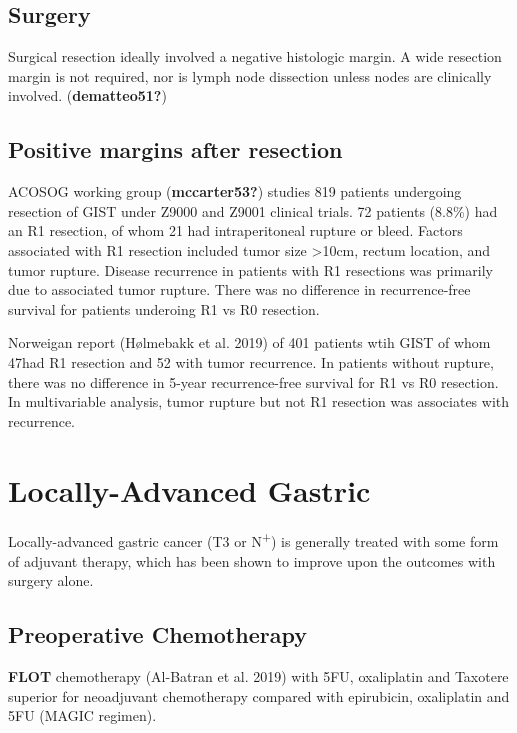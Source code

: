 \documentclass[
  letterpaper,
]{scrbook}
\begin{document}
\section{Surgery}\label{surgery}

Surgical resection ideally involved a negative histologic margin. A wide
resection margin is not required, nor is lymph node dissection unless
nodes are clinically involved. (\textbf{dematteo51?})

\section{Positive margins after
resection}\label{positive-margins-after-resection}

ACOSOG working group (\textbf{mccarter53?}) studies 819 patients
undergoing resection of GIST under Z9000 and Z9001 clinical trials. 72
patients (8.8\%) had an R1 resection, of whom 21 had intraperitoneal
rupture or bleed. Factors associated with R1 resection included tumor
size \textgreater10cm, rectum location, and tumor rupture. Disease
recurrence in patients with R1 resections was primarily due to
associated tumor rupture. There was no difference in recurrence-free
survival for patients underoing R1 vs R0 resection.

Norweigan report (Hølmebakk et al. 2019) of 401 patients wtih GIST of
whom 47had R1 resection and 52 with tumor recurrence. In patients
without rupture, there was no difference in 5-year recurrence-free
survival for R1 vs R0 resection. In multivariable analysis, tumor
rupture but not R1 resection was associates with recurrence.

\chapter{Locally-Advanced Gastric}\label{locally-advanced-gastric}

Locally-advanced gastric cancer (T3 or N\textsuperscript{+}) is
generally treated with some form of adjuvant therapy, which has been
shown to improve upon the outcomes with surgery alone.

\section{Preoperative Chemotherapy}\label{preoperative-chemotherapy}

\textbf{FLOT} chemotherapy (Al-Batran et al. 2019) with 5FU, oxaliplatin
and Taxotere superior for neoadjuvant chemotherapy compared with
epirubicin, oxaliplatin and 5FU (MAGIC regimen).
\end{document}
